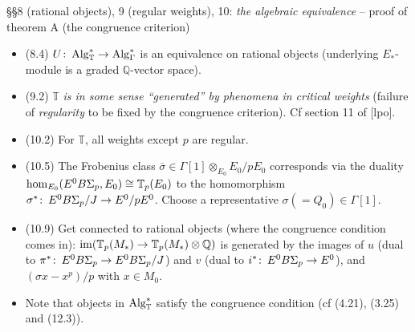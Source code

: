 \documentclass{rs}
\theoremstyle{definition}
\theoremstyle{remark}
\def\co{\colon\thinspace}
\newcommand{\mb}[1]{\mathbb{#1}}
\renewcommand{\=}{\approx}
\renewcommand{\-}{\sim}
\numberwithin{equation}{section}
\numberwithin{thm}{section}
\begin{document}
\S\S 8 (rational objects), 9 (regular weights), 10: {\em the algebraic equivalence} -- proof of theorem A (the congruence criterion)
\begin{itemize}
 \item (8.4) $U \co {\rm Alg}_{\mb T}^* \to {\rm Alg}_\Gamma^*$ is an equivalence on rational objects (underlying $E_*$-module is a graded $\mb Q$-vector space).

 \item (9.2) $\mb T$ {\em is in some sense ``generated'' by phenomena in critical weights} (failure of {\em regularity} to be fixed by the congruence criterion).  
 Cf section 11 of [lpo].

 \item (10.2) For $\mb T$, all weights except $p$ are regular.

 \item (10.5) The Frobenius class $\overline{\sigma} \in \Gamma[1] \otimes_{E_0} E_0 / p E_0$ corresponds via the duality ${\rm hom}_{E_0} (E^0 B\Sigma_p, E_0) \cong {\mb T}_p (E_0)$ to 
 the homomorphism $\sigma^* \co E^0 B\Sigma_p / J \to E^0 / p E^0$.  Choose a representative $\sigma (= Q_0) \in \Gamma[1]$.

 \item (10.9) Get connected to rational objects (where the congruence condition comes in): ${\rm im} ({\mb T}_p (M_*) \to {\mb T}_p (M_*) \otimes {\mb Q})$ 
 is generated by the images of $u$ (dual to $\pi^* \co E^0 B\Sigma_p \to E^0 B\Sigma_p / J$) and $v$ (dual to $i^* \co E^0 B\Sigma_p \to E^0$), and $(\sigma x - x^p) / p$ with $x \in M_0$.

 \item Note that objects in ${\rm Alg}_{\mb T}^*$ satisfy the congruence condition (cf (4.21), (3.25) and (12.3)).
\end{itemize}
\end{document}
